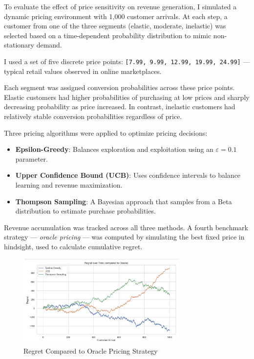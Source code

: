 \documentclass[12pt]{article}
\begin{document}
To evaluate the effect of price sensitivity on revenue generation, I simulated a dynamic pricing environment with 1,000 customer arrivals. At each step, a customer from one of the three segments (elastic, moderate, inelastic) was selected based on a time-dependent probability distribution to mimic non-stationary demand.

I used a set of five discrete price points: \texttt{[7.99, 9.99, 12.99, 19.99, 24.99]} — typical retail values observed in online marketplaces.

Each segment was assigned conversion probabilities across these price points. Elastic customers had higher probabilities of purchasing at low prices and sharply decreasing probability as price increased. In contrast, inelastic customers had relatively stable conversion probabilities regardless of price.

Three pricing algorithms were applied to optimize pricing decisions:
\begin{itemize}
  \item \textbf{Epsilon-Greedy}: Balances exploration and exploitation using an \( \varepsilon = 0.1 \) parameter.
  \item \textbf{Upper Confidence Bound (UCB)}: Uses confidence intervals to balance learning and revenue maximization.
  \item \textbf{Thompson Sampling}: A Bayesian approach that samples from a Beta distribution to estimate purchase probabilities.
\end{itemize}


Revenue accumulation was tracked across all three methods. A fourth benchmark strategy — \textit{oracle pricing} — was computed by simulating the best fixed price in hindsight, used to calculate cumulative regret.

\begin{figure}[h!]
  \centering
  \includegraphics[width=0.75\textwidth]{regret overtime.png}
  \caption{Regret Compared to Oracle Pricing Strategy}
  \label{fig:regret}
\end{figure}
\end{document}
